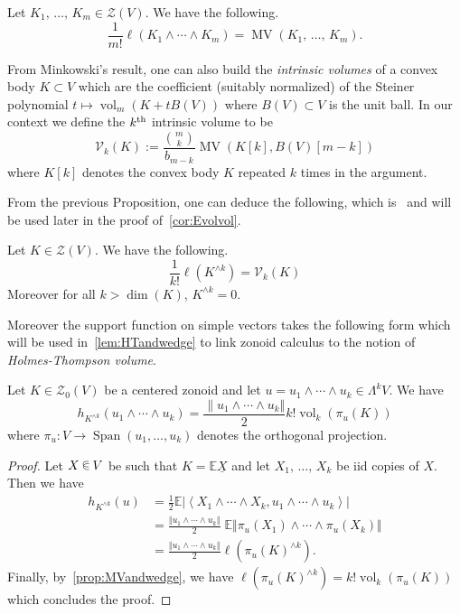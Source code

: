 \documentclass[AHL, Unicode, longabstracts, published]{cedram}
\newcommand{\EE}{\mathbb{E}}
\newcommand{\ZZ}{\mathscr{Z}}
\newcommand{\ZZo}{\mathscr{Z}_0}
\DeclareMathOperator{\vol}{vol}
\DeclareMathOperator{\Span}{Span}
\DeclareMathOperator{\MV}{MV}
\newcommand{\Vint}{\mathcal{V}}
\newcommand{\seg}{\underline}
\newcommand{\uball}{b}
\newcommand*\randin{
\mathchoice {\raisebox{-.35ex}{$\displaystyle{^\subset}$}\mkern-11.5mu\raisebox{+.45ex}{$\displaystyle{_\subset}$}} {\mkern+1mu\raisebox{-.27ex}{$\textstyle{^\subset}$}\mkern-11.7mu\raisebox{+.45ex}{$\textstyle{_\subset}$}} {\raisebox{.35ex}{$\scriptstyle\subset$}\mkern-14mu\raisebox{-.15ex}{$\scriptstyle\subset$}} {\raisebox{.3ex}{$\scriptscriptstyle\subset$}\mkern-13.5mu\raisebox{-.10ex}{$\scriptscriptstyle\subset$}}}
\begin{document}
\begin{prop}[{\cite[Theorem~5.1]{ZA}}]\label{prop:MVandwedge}
Let $K_1,\,\ldots,\,K_m\in\ZZ(V)$. We have the following.
\begin{equation*}
\frac{1}{m!}\ell(K_1\wedge\cdots\wedge K_m)=\MV(K_1,\,\ldots,\,K_m).
\end{equation*}
\end{prop}

From Minkowski's result, one can also build the \emph{intrinsic volumes} of a convex body $K\subset V$ which are the coefficient (suitably normalized) of the Steiner polynomial $t\mapsto \vol_m(K+tB(V))$ where $B(V)\subset V$ is the unit ball. In our context we define the $k^{\rm th}$ intrinsic volume to be
\begin{equation}\label{eq:defvint}
\Vint_k(K):=\frac{\binom{m}{k}}{\uball_{m-k}}\MV(K[k],B(V)[m-k])
\end{equation}
where $K[k]$ denotes the convex body $K$ repeated $k$ times in the argument.

From the previous Proposition, one can deduce the following, which is~\cite[Theorem~5.2]{ZA} and will be used later in the proof of~\cref{cor:Evolvol}.

\begin{prop}\label{prop:kintvolpow}
Let $K\in\ZZ(V)$. We have the following.
\begin{equation*}
\frac{1}{k!}\ell\left(K^{\wedge k}\right)=\Vint_k(K)
\end{equation*}
Moreover for all $k>\dim(K)$, $K^{\wedge k} =0$.
\end{prop}

Moreover the support function on simple vectors takes the following form which will be used in~\cref{lem:HTandwedge} to link zonoid calculus to the notion of \emph{Holmes-Thompson volume}.

\begin{lemm}\label{lem:supofsimplek}
Let $K\in\ZZo(V)$ be a centered zonoid and let $u=u_1\wedge\cdots \wedge u_k\in\Lambda^k V$. We have
\begin{equation*}
h_{K^{\wedge k}}(u_1\wedge\cdots\wedge u_k)=\frac{\|u_1\wedge\cdots\wedge u_k\Vert}{2}k!\vol_k(\pi_u(K))
\end{equation*}
where $\pi_u:V\to \Span(u_1,\ldots,u_k)$ denotes the orthogonal projection.
\end{lemm}

\begin{proof}
Let $X\,\randin\, V$ be such that $K=\EE\seg{X}$ and let $X_1,\,\ldots,\,X_k$ be iid copies of $X$. Then we have
\begin{align*}
h_{K^{\wedge k}}(u)&=\frac{1}{2}\EE\left|\left\langle X_1\wedge \cdots \wedge X_k, u_1\wedge \cdots\wedge u_k\right\rangle\right| \\
&=\frac{\Vert u_1\wedge \cdots \wedge u_k\Vert}{2}\;\EE\Vert \pi_u(X_1)\wedge \cdots \wedge \pi_u(X_k)\Vert \\
&=\frac{\Vert u_1\wedge \cdots \wedge u_k\Vert}{2}\ell\left(\pi_u(K)^{\wedge k}\right).
\end{align*}
Finally, by~\cref{prop:MVandwedge}, we have $\ell(\pi_u(K)^{\wedge k})=k!\vol_k(\pi_u(K))$ which concludes the proof.
\end{proof}
\end{document}
